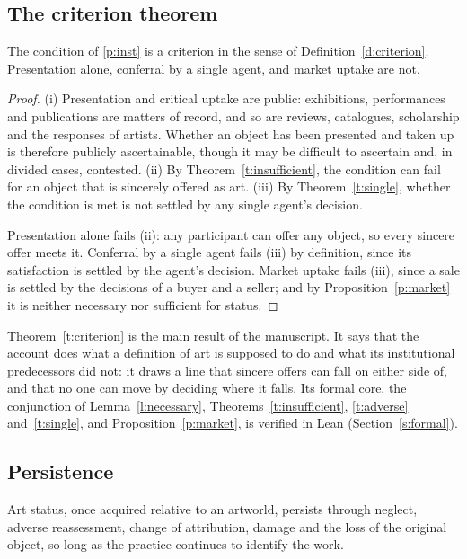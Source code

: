 \documentclass{situationist-preprint}
\begin{document}
\subsection{The criterion theorem}

\begin{theorem}\label{t:criterion}
The condition of \ref{p:inst} is a criterion in the sense of Definition~\ref{d:criterion}. Presentation alone, conferral by a single agent, and market uptake are not.
\end{theorem}

\begin{proof}
(i) Presentation and critical uptake are public: exhibitions, performances and publications are matters of record, and so are reviews, catalogues, scholarship and the responses of artists. Whether an object has been presented and taken up is therefore publicly ascertainable, though it may be difficult to ascertain and, in divided cases, contested. (ii) By Theorem~\ref{t:insufficient}, the condition can fail for an object that is sincerely offered as art. (iii) By Theorem~\ref{t:single}, whether the condition is met is not settled by any single agent's decision.

Presentation alone fails (ii): any participant can offer any object, so every sincere offer meets it. Conferral by a single agent fails (iii) by definition, since its satisfaction is settled by the agent's decision. Market uptake fails (iii), since a sale is settled by the decisions of a buyer and a seller; and by Proposition~\ref{p:market} it is neither necessary nor sufficient for status.
\end{proof}

Theorem~\ref{t:criterion} is the main result of the manuscript. It says that the account does what a definition of art is supposed to do and what its institutional predecessors did not: it draws a line that sincere offers can fall on either side of, and that no one can move by deciding where it falls. Its formal core, the conjunction of Lemma~\ref{l:necessary}, Theorems~\ref{t:insufficient}, \ref{t:adverse} and~\ref{t:single}, and Proposition~\ref{p:market}, is verified in Lean (Section~\ref{s:formal}).

\subsection{Persistence}

\begin{proposition}\label{p:persistence}
Art status, once acquired relative to an artworld, persists through neglect, adverse reassessment, change of attribution, damage and the loss of the original object, so long as the practice continues to identify the work.
\end{proposition}
\end{document}
